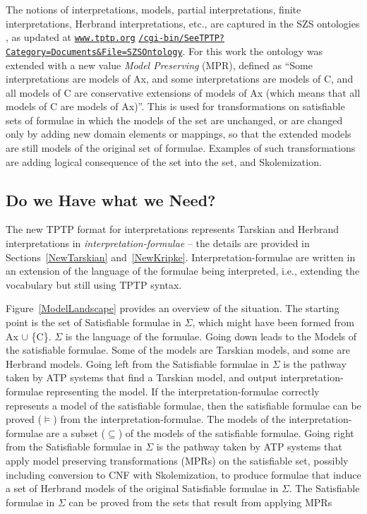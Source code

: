 \documentclass{easychair}
\begin{document}
The notions of interpretations, models, partial interpretations, finite interpretations,
Herbrand interpretations, etc., are captured in the SZS ontologies \cite{Sut08-KEAPPA}, as
updated at 
\href{https://www.tptp.org/cgi-bin/SeeTPTP?Category=Documents\&File=SZSOntology}{\tt www.tptp.org}
\href{https://www.tptp.org/cgi-bin/SeeTPTP?Category=Documents\&File=SZSOntology}{\tt /cgi-bin/SeeTPTP?Category=Documents\&File=SZSOntology}.
For this work the ontology was extended with a new value {\em Model Preserving} (MPR), defined
as ``Some interpretations are models of Ax, and
  some interpretations are models  of C, and
  all models of C are conservative extensions of models of Ax
  (which means that all models of C are models of Ax)''.
This is used for transformations on satisfiable sets of formulae in which the models of the set 
are unchanged, or are changed only by adding new domain elements or mappings, so that the
extended models are still models of the original set of formulae. 
Examples of such transformations are adding logical consequence of the set into the set, and
Skolemization.

\subsection{Do we Have what we Need?}
\label{HaveNeed}

The new TPTP format for interpretations represents Tarskian and Herbrand interpretations in 
{\em interpretation-formulae} -- the details are provided in Sections~\ref{NewTarskian} 
and~\ref{NewKripke}.
Interpretation-formulae are written in an extension of the language of the formulae being 
interpreted, i.e., extending the vocabulary but still using TPTP syntax.

Figure~\ref{ModelLandscape} provides an overview of the situation.
The starting point is the set of {\sf Satisfiable formulae in $\Sigma$}, which might have been
formed from {\sf Ax $\cup$ \{{\raisebox{0.4ex}{\texttildelow}}C\}}. 
$\Sigma$ is the language of the formulae.
Going down leads to the {\sf Models} of the satisfiable formulae.
Some of the models are Tarskian models, and some are Herbrand models.
Going left from the {\sf Satisfiable formulae in $\Sigma$} is the pathway taken by ATP systems 
that find a Tarskian model, and output interpretation-formulae representing the model.
If the interpretation-formulae correctly represents a model of the satisfiable formulae, then
the satisfiable formulae can be proved ($\vDash$) from the interpretation-formulae.
The models of the interpretation-formulae are a subset ($\subseteq$) of the models of the
satisfiable formulae.
Going right from the {\sf Satisfiable formulae in $\Sigma$} is the pathway taken by ATP systems
that apply model preserving transformations ({\sf MPR}s) on the satisfiable set, possibly 
including conversion to CNF with Skolemization, to produce formulae that induce a set of 
Herbrand models of the original {\sf Satisfiable formulae in $\Sigma$}.
The {\sf Satisfiable formulae in $\Sigma$} can be proved from the sets that result from applying 
MPRs
\end{document}
